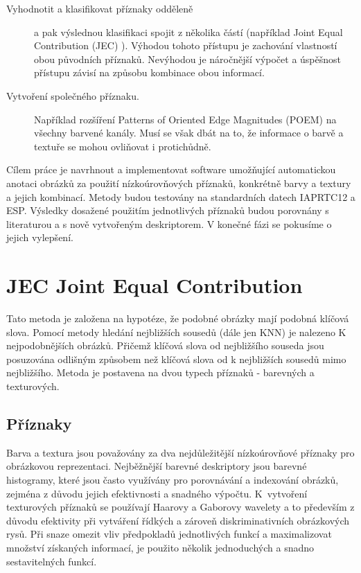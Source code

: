 \documentclass[czech,BP]{thesiskiv}
\begin{document}
\begin{description}
\item[Vyhodnotit a klasifikovat příznaky odděleně] 
a pak výslednou klasifikaci spojit z několika částí (například Joint Equal Contribution (JEC) \cite{JEC} ). Výhodou tohoto přístupu je zachování vlastností obou původních příznaků. Nevýhodou je náročnější výpočet a úspěšnost přístupu závisí na způsobu kombinace obou informací.

\item[Vytvoření společného příznaku.] 
Například rozšíření Patterns of Oriented Edge Magnitudes (POEM) na všechny barvené kanály. Musí se však dbát na to, že informace o barvě a textuře se mohou ovliňovat i protichůdně. 
\end{description} 

\par Cílem práce je navrhnout a implementovat software umožňující automatickou anotaci obrázků za použití nízkoúrovňových příznaků, konkrétně barvy a textury a jejich kombinací. Metody budou testovány na standardních datech IAPRTC12 a ESP. Výsledky dosažené použitím jednotlivých příznaků budou porovnány s literaturou a s nově vytvořeným deskriptorem. V konečné fázi se pokusíme o jejich vylepšení.

\chapter{JEC Joint Equal Contribution}
Tato metoda je založena na hypotéze, že podobné obrázky mají podobná klíčová slova. Pomocí metody hledání nejbližších sousedů (dále jen KNN) je nalezeno K nejpodobnějších obrázků. Přičemž klíčová slova od nejbližšího souseda jsou posuzována odlišným způsobem než klíčová slova od k nejbližších sousedů mimo nejbližšího. Metoda je postavena na dvou typech příznaků - barevných a texturových. 
\cite{JEC}

\section{Příznaky}
\par Barva a textura jsou považovány za dva nejdůležitější nízkoúrovňové příznaky pro obrázkovou reprezentaci. Nejběžnější barevné deskriptory jsou barevné histogramy, které jsou často využívány pro porovnávání a indexování obrázků, zejména z důvodu jejich efektivnosti a snadného výpočtu. K~vytvoření texturových příznaků se používají Haarovy a Gaborovy wavelety a to především z důvodu efektivity při vytváření řídkých a zároveň diskriminativních obrázkových rysů. Při snaze omezit vliv předpokladů jednotlivých funkcí a maximalizovat množství získaných informací, je použito několik jednoduchých a snadno sestavitelných funkcí. \cite{JEC}
\end{document}
